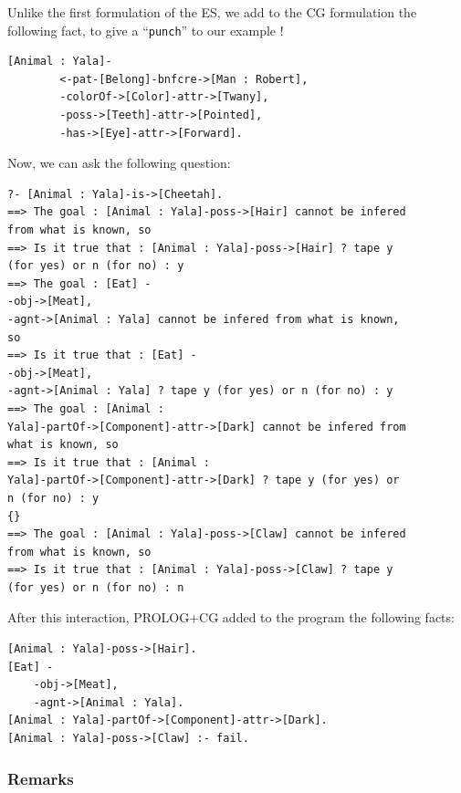 \documentclass{book}
\begin{document}
Unlike the first formulation of the ES, we add to the CG formulation
the following fact, to give a ``\texttt{punch}'' to our example !



\begin{verbatim}
[Animal : Yala]-
        <-pat-[Belong]-bnfcre->[Man : Robert],
        -colorOf->[Color]-attr->[Twany],
        -poss->[Teeth]-attr->[Pointed],
        -has->[Eye]-attr->[Forward].
\end{verbatim}


Now, we can ask the following question:


\begin{verbatim}
?- [Animal : Yala]-is->[Cheetah].
==> The goal : [Animal : Yala]-poss->[Hair] cannot be infered
from what is known, so
==> Is it true that : [Animal : Yala]-poss->[Hair] ? tape y
(for yes) or n (for no) : y
==> The goal : [Eat] -
-obj->[Meat],
-agnt->[Animal : Yala] cannot be infered from what is known,
so
==> Is it true that : [Eat] -
-obj->[Meat],
-agnt->[Animal : Yala] ? tape y (for yes) or n (for no) : y
==> The goal : [Animal :
Yala]-partOf->[Component]-attr->[Dark] cannot be infered from
what is known, so
==> Is it true that : [Animal :
Yala]-partOf->[Component]-attr->[Dark] ? tape y (for yes) or
n (for no) : y
{}
==> The goal : [Animal : Yala]-poss->[Claw] cannot be infered
from what is known, so
==> Is it true that : [Animal : Yala]-poss->[Claw] ? tape y
(for yes) or n (for no) : n
\end{verbatim}



After this interaction, PROLOG+CG added to the program the following
facts:


\begin{verbatim}
[Animal : Yala]-poss->[Hair].
[Eat] -
    -obj->[Meat],
    -agnt->[Animal : Yala].
[Animal : Yala]-partOf->[Component]-attr->[Dark].
[Animal : Yala]-poss->[Claw] :- fail.
\end{verbatim}


\subsubsection{Remarks}
\end{document}
